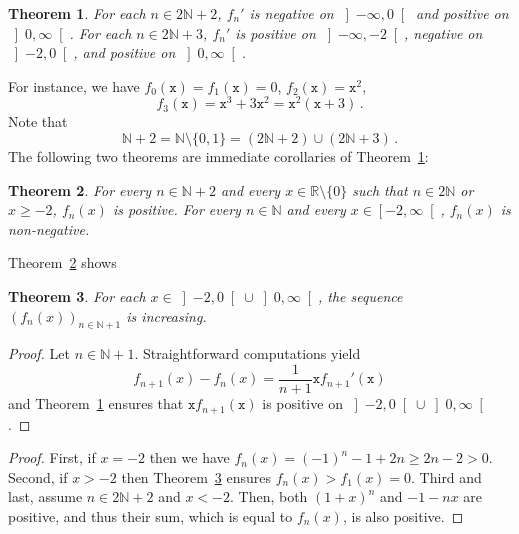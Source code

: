 \documentclass[12pt]{article}
\newcommand{\bR}{\mathbb{R}}
\newcommand{\bN}{\mathbb{N}}
\newcommand{\gtint}[1]{\left] #1, \infty \right[}
\newcommand{\geint}[1]{\left[ #1, \infty \right[}
\newcommand{\ltint}[1]{\left]- \infty, #1 \right[}
\newcommand{\ttx}{\mathtt{x}}
\newtheorem{theorem}{Theorem}
\begin{document}
\begin{theorem} \label{thm:variation}
    For each $n \in 2 \bN + 2$,
    $f_n'$ is
    negative on $\ltint{0}$ and
    positive on $\gtint{0}$.
   For each $n \in 2 \bN + 3$, $f_n'$ is
   positive on $\ltint{- 2}$,
   negative on $\left]- 2, 0 \right[$, and
   positive on $\gtint{0}$.
 \end{theorem}

 
For instance, we have 
$f_0(\ttx) = f_1(\ttx) = 0$,
$f_2(\ttx) = \ttx^2$,
\begin{equation} \label{eq:f3-t3}
f_3(\ttx) = \ttx^3 + 3 \ttx^2 = \ttx^2 (\ttx + 3) \,.
\end{equation}
Note that
$$\bN + 2 = \bN \setminus \{ 0, 1 \} = (2 \bN + 2) \cup (2 \bN + 3) \, .$$
The following two theorems are immediate corollaries of Theorem~\ref{thm:variation}:

 \begin{theorem}%
   \label{thm:Bernoulli}
   For every $n \in \bN + 2$ and every $x \in \bR \setminus \{ 0 \}$ such that $n \in 2 \bN$ or $x \ge - 2$,
   $f_n(x)$ is positive.
   For every $n \in \bN$ and every $x \in \geint{-2}$, $f_n(x)$ is non-negative.
 \end{theorem}

 Theorem~\ref{thm:Bernoulli} shows  
 
\begin{theorem} \label{thm:increasing-fn}
  For each $x \in \left]- 2, 0 \right[ \cup \gtint{0}$,
  the sequence $\left( f_n(x) \right)_{n \in \bN + 1}$ is increasing.
\end{theorem} 

\begin{proof}
  Let $n \in \bN + 1$.
 Straightforward computations yield  
 $$
 f_{n+ 1} (x) - f_n(x) = \frac{1}{n + 1}  \ttx f_{n + 1}'(\ttx) 
 $$
 and
 Theorem~\ref{thm:variation} ensures that $\ttx f_{n + 1}(\ttx)$ is positive on $\left]- 2, 0 \right[ \cup \gtint{0}$.
\end{proof} 


 \begin{proof}
   First,
   if $x = - 2$ then 
   we have $f_n(x) = {(- 1)}^n - 1 + 2n \ge 2 n - 2 > 0$.
   Second,
   if $x > - 2$ then Theorem~\ref{thm:increasing-fn} ensures $f_n(x) > f_1(x) =  0$.
   Third and last, assume $n \in 2 \bN + 2$ and $x < - 2$.
   Then, both ${(1 + x)}^n$ and $- 1 - n x$ are positive,
   and thus their sum, which is equal to $f_n(x)$, is also positive.
 \end{proof}
 
\end{document}
